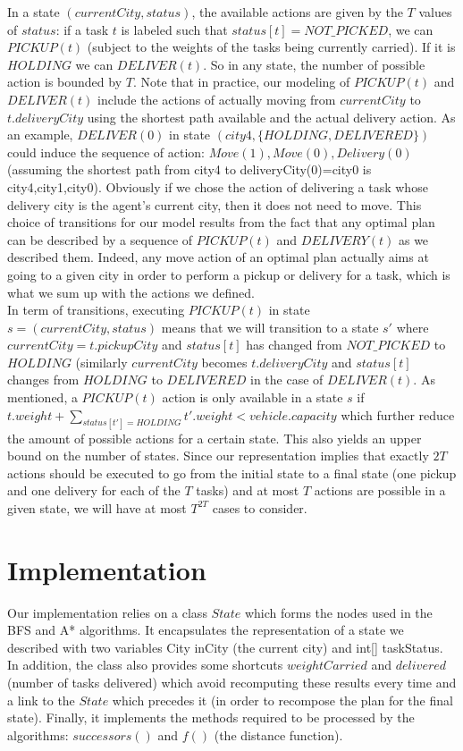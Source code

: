 \documentclass[11pt]{article}
\begin{document}
In a state $(currentCity, status)$, the available actions are given by the $T$ values of $status$: if a task $t$ is labeled such that $status[t]=NOT\_PICKED$, we can $PICKUP(t)$ (subject to the weights of the tasks being currently carried). If it is $HOLDING$ we can $DELIVER(t)$. So in any state, the number of possible action is bounded by $T$. Note that in practice, our modeling of $PICKUP(t)$ and $DELIVER(t)$ include the actions of actually moving from $currentCity$ to $t.deliveryCity$ using the shortest path available and the actual delivery action. As an example, $DELIVER(0)$ in state $(city4,\{HOLDING,DELIVERED\})$ could induce the sequence of action: $Move(1),Move(0),Delivery(0)$ (assuming the shortest path from city4 to deliveryCity(0)=city0 is city4,city1,city0). Obviously if we chose the action of delivering a task whose delivery city is the agent's current city, then it does not need to move. This choice of transitions for our model results from the fact that any optimal plan can be described by a sequence of $PICKUP(t)$ and $DELIVERY(t)$ as we described them. Indeed, any move action of an optimal plan actually aims at going to a given city in order to perform a pickup or delivery for a task, which is what we sum up with the actions we defined. \\
In term of transitions, executing $PICKUP(t)$ in state $s=(currentCity, status)$ means that we will transition to a state $s'$ where $currentCity=t.pickupCity$ and $status[t]$ has changed from $NOT\_PICKED$ to $HOLDING$ (similarly $currentCity$ becomes $t.deliveryCity$ and $status[t]$ changes from $HOLDING$ to $DELIVERED$ in the case of $DELIVER(t)$. As mentioned, a $PICKUP(t)$ action is only available in a state $s$ if $t.weight+\sum_{status[t']=HOLDING}t'.weight<vehicle.capacity$ which further reduce the amount of possible actions for a certain state. This also yields an upper bound on the number of states. Since our representation implies that exactly $2T$ actions should be executed to go from the initial state to a final state (one pickup and one delivery for each of the $T$ tasks) and at most $T$ actions are possible in a given state, we will have at most $T^{2T}$ cases to consider.  


\section{Implementation}

Our implementation relies on a class $State$ which forms the nodes used in the BFS and A* algorithms. It encapsulates the representation of a state we described with two variables City inCity (the current city) and int[] taskStatus. In addition, the class also provides some shortcuts $weightCarried$ and $delivered$ (number of tasks delivered) which avoid recomputing these results every time and a link to the $State$ which precedes it (in order to recompose the plan for the final state).
Finally, it implements the methods required to be processed by the algorithms: $successors()$ and $f()$ (the distance function).
\end{document}
